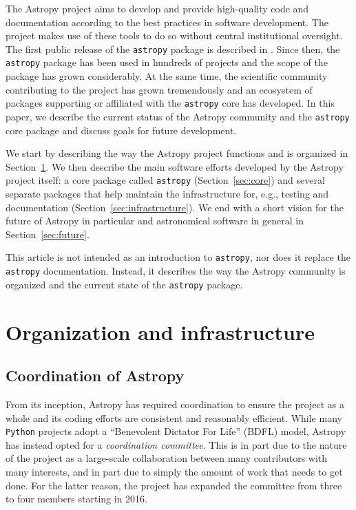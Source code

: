 \documentclass[modern]{aastex61}
\newcommand{\package}[1]{\texttt{#1}\xspace}
\newcommand{\python}{\package{Python}}
\newcommand{\astropy}{Astropy\xspace}
\newcommand{\astropypkg}{\package{astropy}}
\newcommand{\sectionname}{Section\xspace}
\begin{document}
The \astropy project aims to develop and provide high-quality code and
documentation according to the best practices in software development.
The project makes use of these tools to do so without central institutional
oversight.
The first public release of the \astropypkg package is described in
\cite{astropy}. Since then, the \astropypkg package has been
used in hundreds of projects and the scope of the package has grown
considerably. At the same time, the scientific community
contributing to the project has grown tremendously and an ecosystem
of packages supporting or affiliated with the \astropypkg core has
developed.
In this paper, we describe the current status of the \astropy community and the
\astropypkg core package and discuss goals for future development.

We start by describing the way the \astropy project functions and is organized
in \sectionname~\ref{sec:org}. We then describe the main software efforts
developed by the \astropy project itself: a core package called \astropypkg
(\sectionname~\ref{sec:core}) and several separate packages that help maintain
the infrastructure for, e.g., testing and documentation
(\sectionname~\ref{sec:infrastructure}). We end with a short vision for
the future of \astropy in particular and astronomical software in general
in \sectionname~\ref{sec:future}.

This article is not intended as an introduction to \astropypkg, nor does it replace the \astropypkg documentation. Instead, it describes the way the \astropy community is organized and the current state of the \astropypkg package.

\section{Organization and infrastructure}
\label{sec:org}

\subsection{Coordination of Astropy}
\label{sect:coordcom}
From its inception, \astropy has required coordination to ensure the project
as a whole and its coding efforts are consistent and reasonably efficient.
While many \python projects adopt a ``Benevolent Dictator For Life'' (BDFL)
model, \astropy has instead opted for a \emph{coordination committee}.  This
is in part due to the nature of the project as a large-scale collaboration
between many contributors with many interests, and in part due to simply the
amount of work that needs to get done.  For the latter reason, the
project has expanded the committee from three to four members starting in
2016.
\end{document}
